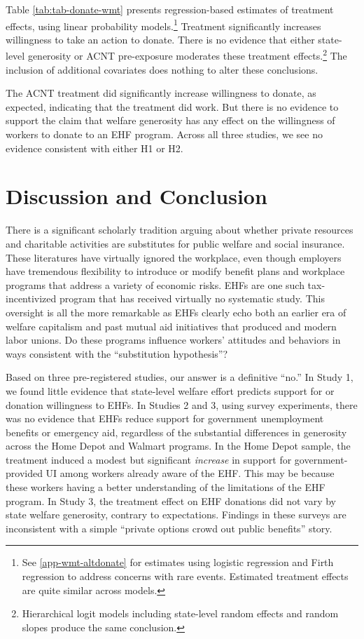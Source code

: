 \documentclass[
  11pt,
  oneside]{article}
\begin{document}
Table \ref{tab:tab-donate-wmt} presents regression-based estimates of treatment effects, using linear probability models.\footnote{See \ref{app-wmt-altdonate} for estimates using logistic regression and Firth regression to address concerns with rare events. Estimated treatment effects are quite similar across models.} Treatment significantly increases willingness to take an action to donate. There is no evidence that either state-level generosity or ACNT pre-exposure moderates these treatment effects.\footnote{Hierarchical logit models including state-level random effects and random slopes produce the same conclusion.} The inclusion of additional covariates does nothing to alter these conclusions.

The ACNT treatment did significantly increase willingness to donate, as expected, indicating that the treatment did work. But there is no evidence to support the claim that welfare generosity has any effect on the willingness of workers to donate to an EHF program. Across all three studies, we see no evidence consistent with either H1 or H2.

\section{Discussion and Conclusion}\label{sec-conclusion}

There is a significant scholarly tradition arguing about whether private resources and charitable activities are substitutes for public welfare and social insurance. These literatures have virtually ignored the workplace, even though employers have tremendous flexibility to introduce or modify benefit plans and workplace programs that address a variety of economic risks. EHFs are one such tax-incentivized program that has received virtually no systematic study. This oversight is all the more remarkable as EHFs clearly echo both an earlier era of welfare capitalism and past mutual aid initiatives that produced and modern labor unions. Do these programs influence workers' attitudes and behaviors in ways consistent with the ``substitution hypothesis''?

Based on three pre-registered studies, our answer is a definitive ``no.'' In Study 1, we found little evidence that state-level welfare effort predicts support for or donation willingness to EHFs. In Studies 2 and 3, using survey experiments, there was no evidence that EHFs reduce support for government unemployment benefits or emergency aid, regardless of the substantial differences in generosity across the Home Depot and Walmart programs. In the Home Depot sample, the treatment induced a modest but significant \emph{increase} in support for government-provided UI among workers already aware of the EHF. This may be because these workers having a better understanding of the limitations of the EHF program. In Study 3, the treatment effect on EHF donations did not vary by state welfare generosity, contrary to expectations. Findings in these surveys are inconsistent with a simple ``private options crowd out public benefits'' story.
\end{document}
